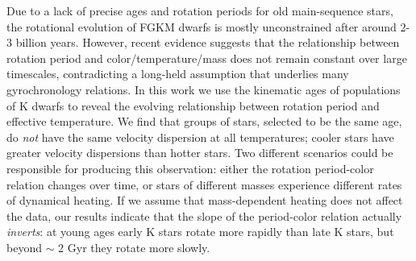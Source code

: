 
Due to a lack of precise ages and rotation periods for old main-sequence
stars, the rotational evolution of FGKM dwarfs is mostly unconstrained
after around 2-3 billion years.
However, recent evidence suggests that the relationship between rotation
period and color/temperature/mass does not remain constant over large
timescales, contradicting a long-held assumption that underlies many
gyrochronology relations.
In this work we use the kinematic ages of populations of K dwarfs to reveal
the evolving relationship between rotation period and effective temperature.
We find that groups of stars, selected to be the same age, do {\it not} have
the same velocity dispersion at all temperatures; cooler stars have greater
velocity dispersions than hotter stars.
Two different scenarios could be responsible for producing this observation:
either the rotation period-color relation changes over time, or stars of
different masses experience different rates of dynamical heating.
If we assume that mass-dependent heating does not affect the data, our results
indicate that the slope of the period-color relation actually {\it inverts}:
at young ages early K stars rotate more rapidly than late K stars, but beyond
$\sim$ 2 Gyr they rotate more slowly.

